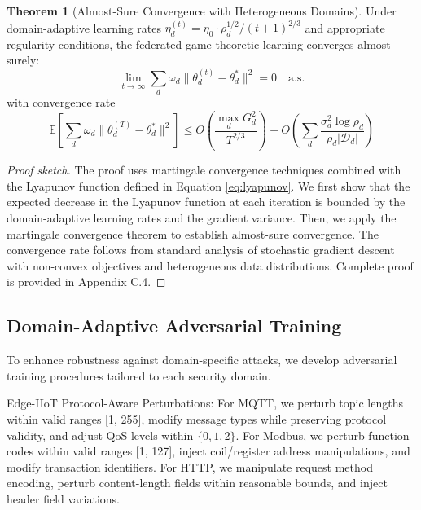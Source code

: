 \documentclass[12pt,a4paper]{article}
\theoremstyle{definition}
\newtheorem{theorem}{Theorem}[section]
\newcommand{\E}{\mathbb{E}}
\newcommand{\D}{\mathcal{D}}
\begin{document}
\begin{theorem}[Almost-Sure Convergence with Heterogeneous Domains]
\label{thm:convergence}
Under domain-adaptive learning rates $\eta_d^{(t)} = \eta_0 \cdot \rho_d^{1/2} / (t+1)^{2/3}$ and appropriate regularity conditions, the federated game-theoretic learning converges almost surely: 
\begin{equation}
\lim_{t \to \infty} \sum_d \omega_d \|\theta_d^{(t)} - \theta_d^*\|^2 = 0 \quad \text{a.s.}
\end{equation}
with convergence rate 
\begin{equation}
\E\left[\sum_d \omega_d \|\theta_d^{(T)} - \theta_d^*\|^2\right] \leq O\left(\frac{\max_d G_d^2}{T^{2/3}}\right) + O\left(\sum_d \frac{\sigma_d^2 \log \rho_d}{\rho_d |\D_d|}\right)
\end{equation}
\end{theorem}

\begin{proof}[Proof sketch]
The proof uses martingale convergence techniques combined with the Lyapunov function defined in Equation \eqref{eq:lyapunov}. We first show that the expected decrease in the Lyapunov function at each iteration is bounded by the domain-adaptive learning rates and the gradient variance. Then, we apply the martingale convergence theorem to establish almost-sure convergence. The convergence rate follows from standard analysis of stochastic gradient descent with non-convex objectives and heterogeneous data distributions. Complete proof is provided in Appendix C.4.
\end{proof}

\subsection{Domain-Adaptive Adversarial Training}

To enhance robustness against domain-specific attacks, we develop adversarial training procedures tailored to each security domain.

Edge-IIoT Protocol-Aware Perturbations: For MQTT, we perturb topic lengths within valid ranges [1, 255], modify message types while preserving protocol validity, and adjust QoS levels within $\{0, 1, 2\}$. For Modbus, we perturb function codes within valid ranges [1, 127], inject coil/register address manipulations, and modify transaction identifiers. For HTTP, we manipulate request method encoding, perturb content-length fields within reasonable bounds, and inject header field variations.
\end{document}
